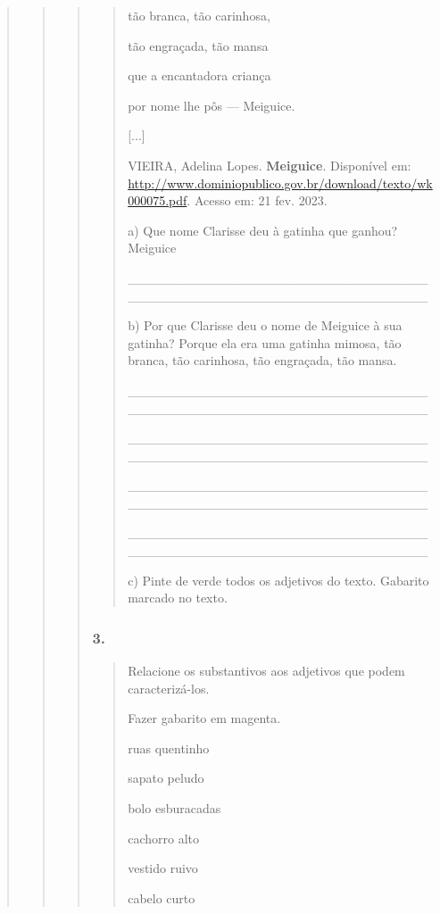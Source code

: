 \begin{quote}
\begin{quote}
\begin{quote}
\begin{quote}
tão branca, tão carinhosa,

tão engraçada, tão mansa

que a encantadora criança

por nome lhe pôs --- Meiguice.

{[}...{]}

VIEIRA, Adelina Lopes. \textbf{Meiguice}. Disponível em:
\url{http://www.dominiopublico.gov.br/download/texto/wk000075.pdf}.
Acesso em: 21 fev. 2023.

a) Que nome Clarisse deu à gatinha que ganhou? Meiguice

\_\_\_\_\_\_\_\_\_\_\_\_\_\_\_\_\_\_\_\_\_\_\_\_\_\_\_\_\_\_\_\_\_\_\_\_\_\_\_\_\_\_\_\_\_\_\_\_\_\_\_\_\_\_\_\_\_\_\_\_\_\_\_\_

b) Por que Clarisse deu o nome de Meiguice à sua gatinha? Porque ela era
uma gatinha mimosa, tão branca, tão carinhosa, tão engraçada, tão mansa.

\_\_\_\_\_\_\_\_\_\_\_\_\_\_\_\_\_\_\_\_\_\_\_\_\_\_\_\_\_\_\_\_\_\_\_\_\_\_\_\_\_\_\_\_\_\_\_\_\_\_\_\_\_\_\_\_\_\_\_\_\_\_\_\_

\_\_\_\_\_\_\_\_\_\_\_\_\_\_\_\_\_\_\_\_\_\_\_\_\_\_\_\_\_\_\_\_\_\_\_\_\_\_\_\_\_\_\_\_\_\_\_\_\_\_\_\_\_\_\_\_\_\_\_\_\_\_\_\_

\_\_\_\_\_\_\_\_\_\_\_\_\_\_\_\_\_\_\_\_\_\_\_\_\_\_\_\_\_\_\_\_\_\_\_\_\_\_\_\_\_\_\_\_\_\_\_\_\_\_\_\_\_\_\_\_\_\_\_\_\_\_\_\_

\_\_\_\_\_\_\_\_\_\_\_\_\_\_\_\_\_\_\_\_\_\_\_\_\_\_\_\_\_\_\_\_\_\_\_\_\_\_\_\_\_\_\_\_\_\_\_\_\_\_\_\_\_\_\_\_\_\_\_\_\_\_\_\_

c) Pinte de verde todos os adjetivos do texto. Gabarito marcado no
texto.
\end{quote}

\subsubsection{3. }\label{section-59}

\begin{quote}
Relacione os substantivos aos adjetivos que podem caracterizá-los.

Fazer gabarito em magenta.

ruas quentinho

sapato peludo

bolo esburacadas

cachorro alto

vestido ruivo

cabelo curto
\end{quote}


\end{quote}
\end{quote}
\end{quote}
